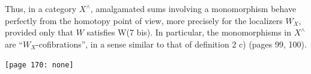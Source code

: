 \documentclass[11pt]{article}
\newcommand{\msp}[1]{\marginpar{\footnotesize [#1]}}
\begin{document}
Thus, in a category $X^\wedge$, amalgamated sums involving a monomorphism behave perfectly from the homotopy point of view, more precisely for the localizers $W_X$, provided \msp{page 169} only that $W$ satisfies W(7 bis). In particular, the monomorphisms in $X^\wedge$ are ``$W_X$-cofibrations'', in a sense similar to that of definition 2 c) (pages 99, 100).

\texttt{[page 170: none]}
\end{document}
